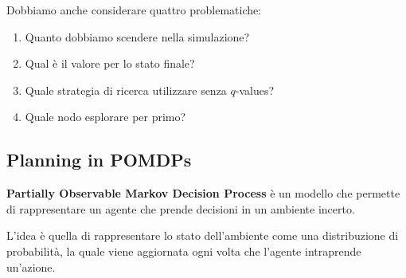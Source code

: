 Dobbiamo anche considerare quattro problematiche:
\begin{enumerate}
    \item Quanto dobbiamo scendere nella simulazione?
    \item Qual è il valore per lo stato finale?
    \item Quale strategia di ricerca utilizzare senza $q$-values?
    \item Quale nodo esplorare per primo?
\end{enumerate}
\subsection{Planning in POMDPs}
\textbf{Partially Observable Markov Decision Process} è un modello che permette di
rappresentare un agente che prende decisioni in un ambiente incerto. 

L'idea è quella di rappresentare lo stato dell'ambiente come una distribuzione di
probabilità, la quale viene aggiornata ogni volta che l'agente intraprende un'azione.